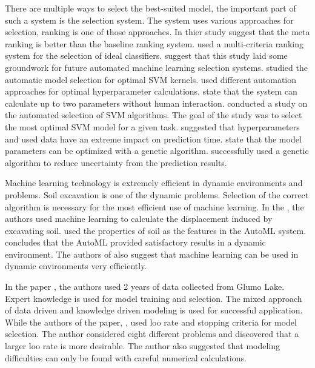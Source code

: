 There are multiple ways to select the best-suited model, the important part of such a system is the selection system. The system uses various approaches for selection, ranking is one of those approaches. In thier study \cite{ref_paper_23} suggest that the meta ranking is better than the baseline ranking system. \cite{ref_paper_23} used a multi-criteria ranking system for the selection of ideal classifiers. \cite{ref_paper_23} suggest that this study laid some groundwork for future automated machine learning selection systems. \cite{ref_paper_3} studied the automatic model selection for optimal SVM kernels. \cite{ref_paper_3} used different automation approaches for optimal hyperparameter calculations. \cite{ref_paper_3} state that the system can calculate up to two parameters without human interaction. \cite{ref_paper_2} conducted a study on the automated selection of SVM algorithms. The goal of the study was to select the most optimal SVM model for a given task. \cite{ref_paper_2} suggested that hyperparameters and used data have an extreme impact on prediction time. \cite{ref_paper_39} state that the model parameters can be optimized with a genetic algorithm. \cite{ref_paper_39} successfully used a genetic algorithm to reduce uncertainty from the prediction results.

Machine learning technology is extremely efficient in dynamic environments and problems. Soil excavation is one of the dynamic problems. Selection of the correct algorithm is necessary for the most efficient use of machine learning. In the \cite{ref_paper_1}, the authors used machine learning to calculate the displacement induced by excavating soil. \citeauthor{ref_paper_1} used the properties of soil as the features in the AutoML system. \citeauthor{ref_paper_1} concludes that the AutoML provided satisfactory results in a dynamic environment. The authors of \cite{ref_paper_13} also suggest that machine learning can be used in dynamic environments very efficiently.



In the paper \cite{ref_paper_43}, the authors used 2 years of data collected from Glumo Lake. Expert knowledge is used for model training and selection. The mixed approach of data driven and knowledge driven modeling is used for successful application. While the authors of the paper, \cite{ref_paper_2}, used loo rate and stopping criteria for model selection. The author considered eight different problems and discovered that a larger loo rate is more desirable. The author also suggested that modeling difficulties can only be found with careful numerical calculations.

